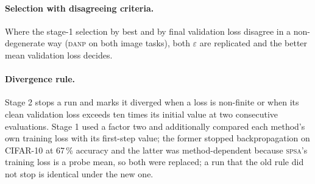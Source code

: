 \documentclass{article}
\newcommand{\method}[1]{\textsc{#1}}
\newcommand{\SPSA}{\method{spsa}}
\newcommand{\DANP}{\method{danp}}
\begin{document}
\paragraph{Selection with disagreeing criteria.}
Where the stage-1 selection by
best and by final validation loss disagree in a non-degenerate way (\DANP{} on both
image tasks), both $\varepsilon$ are replicated and the better mean validation loss
decides.

\paragraph{Divergence rule.}
Stage 2 stops a run and marks it diverged when a loss is non-finite or when its clean
validation loss exceeds ten times its initial value at two consecutive evaluations.
Stage 1 used a factor two and additionally compared
each method's own training loss with its first-step value; the former stopped
backpropagation on CIFAR-10 at 67\,\% accuracy and the latter was method-dependent
because \SPSA{}'s training loss is a probe mean, so both were replaced; a run that the
old rule did not stop is identical under the new one.
\end{document}
